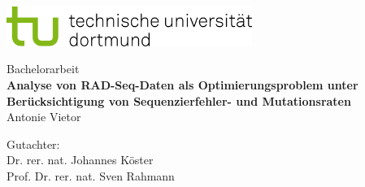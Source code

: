 \begin{titlepage}
	\vspace*{-2cm}
	\newlength{\links}
	\setlength{\links}{-1.5cm}
	\sffamily
	\hspace*{\links}
	\begin{minipage}{12.5cm}
		\includegraphics[width=8cm]{bilder/tud_logo_rgb}
	\end{minipage}

	\vspace*{4.5cm}

	\hspace*{\links}
	\hspace*{-0.7cm}
	\begin{minipage}{17cm}
		\large	
		\begin{center}
			{\Large Bachelorarbeit} \\
			\vspace*{1cm}
			\textbf{Analyse von RAD-Seq-Daten als Optimierungsproblem unter  Berücksichtigung von Sequenzierfehler- und Mutationsraten} \\
			\vspace*{1cm}
			Antonie Vietor
		\end{center}
	\end{minipage}
	\normalsize
	\vspace*{4.5cm}



	\vspace*{3.5cm}

	\hspace*{\links}
	\begin{minipage}[b]{8cm}
		\raggedright
		Gutachter: \\
		Dr. rer. nat. Johannes Köster \\
		Prof. Dr. rer. nat. Sven Rahmann \\
	\end{minipage}
	

\end{titlepage}
